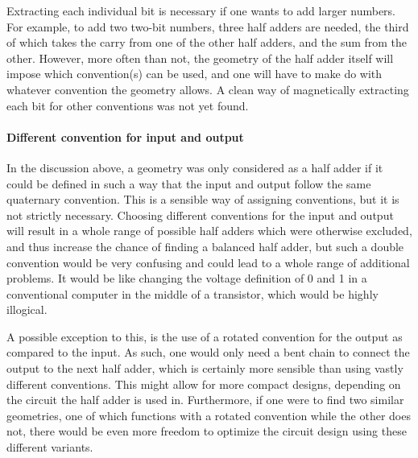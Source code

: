 \documentclass[11pt,a4paper,english,twoside]{article}
\begin{document}
Extracting each individual bit is necessary if one wants to add larger numbers. For example, to add two two-bit numbers, three half adders are needed, the third of which takes the carry from one of the other half adders, and the sum from the other. However, more often than not, the geometry of the half adder itself will impose which convention(s) can be used, and one will have to make do with whatever convention the geometry allows. A clean way of magnetically extracting each bit for other conventions was not yet found. 

\paragraph{Different convention for input and output}
In the discussion above, a geometry was only considered as a half adder if it could be defined in such a way that the input and output follow the same quaternary convention. This is a sensible way of assigning conventions, but it is not strictly necessary. Choosing different conventions for the input and output will result in a whole range of possible half adders which were otherwise excluded, and thus increase the chance of finding a balanced half adder, but such a double convention would be very confusing and could lead to a whole range of additional problems. It would be like changing the voltage definition of 0 and 1 in a conventional computer in the middle of a transistor, which would be highly illogical. \par
A possible exception to this, is the use of a rotated convention for the output as compared to the input. As such, one would only need a bent chain to connect the output to the next half adder, which is certainly more sensible than using vastly different conventions. This might allow for more compact designs, depending on the circuit the half adder is used in. Furthermore, if one were to find two similar geometries, one of which functions with a rotated convention while the other does not, there would be even more freedom to optimize the circuit design using these different variants.
\end{document}
